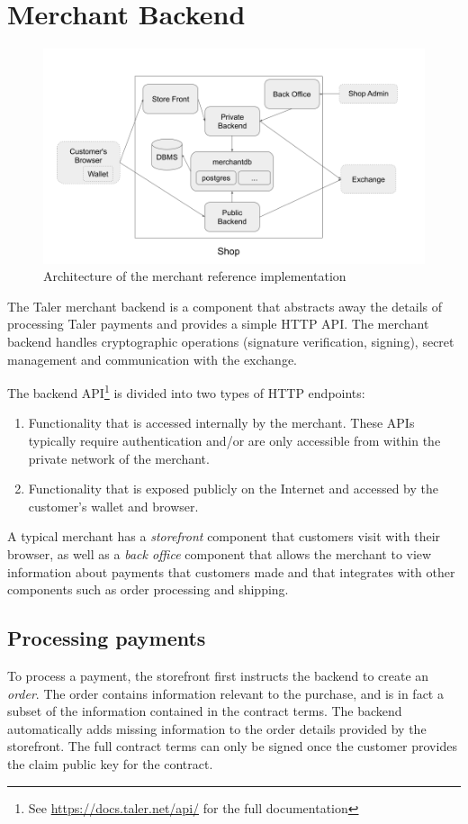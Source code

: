 \section{Merchant Backend}
\begin{figure}
    \includegraphics[width=\textwidth]{diagrams/taler-diagram-merchant.png}
    \caption{Architecture of the merchant reference implementation}
\end{figure}

The Taler merchant backend is a component that abstracts away the details of
processing Taler payments and provides a simple HTTP API.  The merchant backend
handles cryptographic operations (signature verification, signing), secret
management and communication with the exchange.

The backend API\footnote{See \url{https://docs.taler.net/api/} for the full documentation}
is divided into two types of HTTP endpoints:
\begin{enumerate}
  \item Functionality that is accessed internally by the merchant.  These APIs typically
    require authentication and/or are only accessible from within the private
    network of the merchant.
  \item Functionality that is exposed publicly on the Internet and accessed by the customer's wallet and browser.
\end{enumerate}

A typical merchant has a \emph{storefront} component that customers visit with
their browser, as well as a \emph{back office} component that allows the
merchant to view information about payments that customers made and that integrates
with other components such as order processing and shipping.

\subsection{Processing payments}\label{sec:processing-payments}
To process a payment, the storefront first instructs the backend to create an
\emph{order}.  The order contains information relevant to the purchase, and is
in fact a subset of the information contained in the contract terms.  The
backend automatically adds missing information to the order details provided by
the storefront.  The full contract terms can only be signed once the customer
provides the claim public key for the contract.

